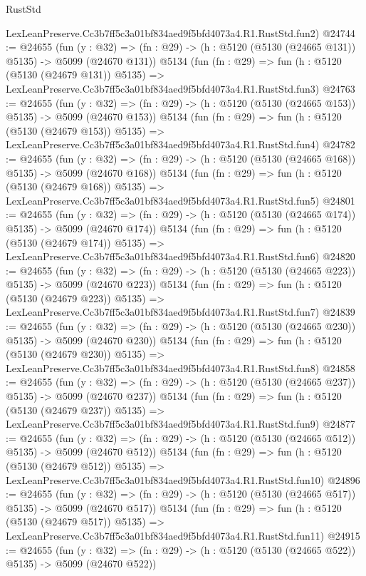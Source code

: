 \begin{lexlean}{RustStd}
\begin{coremodule}
    LexLeanPreserve.Cc3b7ff5c3a01bf834aed9f5bfd4073a4.R1.RustStd.fun2)
@24744 := @24655
    (fun (y : @32) => (fn : @29) -> (h : @5120 (@5130 (@24665 @131)) @5135) -> @5099 (@24670 @131))
    @5134
    (fun (fn : @29) =>
    fun (h : @5120 (@5130 (@24679 @131)) @5135) =>
    LexLeanPreserve.Cc3b7ff5c3a01bf834aed9f5bfd4073a4.R1.RustStd.fun3)
@24763 := @24655
    (fun (y : @32) => (fn : @29) -> (h : @5120 (@5130 (@24665 @153)) @5135) -> @5099 (@24670 @153))
    @5134
    (fun (fn : @29) =>
    fun (h : @5120 (@5130 (@24679 @153)) @5135) =>
    LexLeanPreserve.Cc3b7ff5c3a01bf834aed9f5bfd4073a4.R1.RustStd.fun4)
@24782 := @24655
    (fun (y : @32) => (fn : @29) -> (h : @5120 (@5130 (@24665 @168)) @5135) -> @5099 (@24670 @168))
    @5134
    (fun (fn : @29) =>
    fun (h : @5120 (@5130 (@24679 @168)) @5135) =>
    LexLeanPreserve.Cc3b7ff5c3a01bf834aed9f5bfd4073a4.R1.RustStd.fun5)
@24801 := @24655
    (fun (y : @32) => (fn : @29) -> (h : @5120 (@5130 (@24665 @174)) @5135) -> @5099 (@24670 @174))
    @5134
    (fun (fn : @29) =>
    fun (h : @5120 (@5130 (@24679 @174)) @5135) =>
    LexLeanPreserve.Cc3b7ff5c3a01bf834aed9f5bfd4073a4.R1.RustStd.fun6)
@24820 := @24655
    (fun (y : @32) => (fn : @29) -> (h : @5120 (@5130 (@24665 @223)) @5135) -> @5099 (@24670 @223))
    @5134
    (fun (fn : @29) =>
    fun (h : @5120 (@5130 (@24679 @223)) @5135) =>
    LexLeanPreserve.Cc3b7ff5c3a01bf834aed9f5bfd4073a4.R1.RustStd.fun7)
@24839 := @24655
    (fun (y : @32) => (fn : @29) -> (h : @5120 (@5130 (@24665 @230)) @5135) -> @5099 (@24670 @230))
    @5134
    (fun (fn : @29) =>
    fun (h : @5120 (@5130 (@24679 @230)) @5135) =>
    LexLeanPreserve.Cc3b7ff5c3a01bf834aed9f5bfd4073a4.R1.RustStd.fun8)
@24858 := @24655
    (fun (y : @32) => (fn : @29) -> (h : @5120 (@5130 (@24665 @237)) @5135) -> @5099 (@24670 @237))
    @5134
    (fun (fn : @29) =>
    fun (h : @5120 (@5130 (@24679 @237)) @5135) =>
    LexLeanPreserve.Cc3b7ff5c3a01bf834aed9f5bfd4073a4.R1.RustStd.fun9)
@24877 := @24655
    (fun (y : @32) => (fn : @29) -> (h : @5120 (@5130 (@24665 @512)) @5135) -> @5099 (@24670 @512))
    @5134
    (fun (fn : @29) =>
    fun (h : @5120 (@5130 (@24679 @512)) @5135) =>
    LexLeanPreserve.Cc3b7ff5c3a01bf834aed9f5bfd4073a4.R1.RustStd.fun10)
@24896 := @24655
    (fun (y : @32) => (fn : @29) -> (h : @5120 (@5130 (@24665 @517)) @5135) -> @5099 (@24670 @517))
    @5134
    (fun (fn : @29) =>
    fun (h : @5120 (@5130 (@24679 @517)) @5135) =>
    LexLeanPreserve.Cc3b7ff5c3a01bf834aed9f5bfd4073a4.R1.RustStd.fun11)
@24915 := @24655
    (fun (y : @32) => (fn : @29) -> (h : @5120 (@5130 (@24665 @522)) @5135) -> @5099 (@24670 @522))

\end{coremodule}
\end{lexlean}
